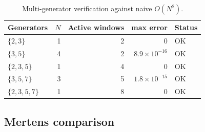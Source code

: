 \documentclass[11pt,a4paper]{amsart}
\theoremstyle{plain}
\theoremstyle{definition}
\theoremstyle{remark}
\begin{document}
\begin{table}[H]
\centering
\begin{tabular}{lrrrl}
\hline
Generators & $N$ & Active windows & max error & Status \\
\hline
$\{2,3\}$     & 1 & 2 & $0$                   & OK \\
$\{3,5\}$     & 4 & 2 & $8.9\times10^{-16}$   & OK \\
$\{2,3,5\}$   & 1 & 4 & $0$                   & OK \\
$\{3,5,7\}$   & 3 & 5 & $1.8\times10^{-15}$   & OK \\
$\{2,3,5,7\}$ & 1 & 8 & $0$                   & OK \\
\hline
\end{tabular}
\caption{Multi-generator verification against naive $O(N^2)$.}
\label{tab:multi-gen}
\end{table}

\subsection{Mertens comparison}
\end{document}
